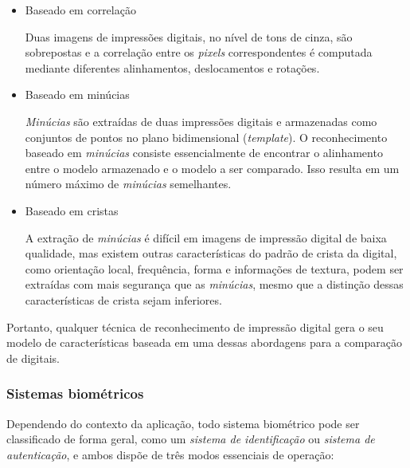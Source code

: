  \begin{itemize}
  \item Baseado em correlação
      
  Duas imagens de impressões digitais, no nível de tons de cinza, são sobrepostas e a correlação entre os \textit{pixels} correspondentes é computada mediante diferentes alinhamentos, deslocamentos e rotações.

  \item Baseado em minúcias
  
  \textit{Minúcias} são extraídas de duas impressões digitais e armazenadas como conjuntos de pontos no plano bidimensional (\textit{template}). O reconhecimento baseado em \textit{minúcias} consiste essencialmente de encontrar o alinhamento entre o modelo armazenado e o modelo a ser comparado. Isso resulta em um número máximo de \textit{minúcias} semelhantes.


  \item Baseado em cristas
 
  A extração de \textit{minúcias} é difícil em imagens de impressão digital de baixa qualidade, mas existem outras características do padrão de crista da digital, como orientação local, frequência, forma e informações de textura, podem ser extraídas com mais segurança que as \textit{minúcias}, mesmo que a distinção dessas características de crista sejam inferiores.

  \end{itemize}
  
  
  Portanto, qualquer técnica de reconhecimento de impressão digital gera o seu modelo de características baseada em uma dessas abordagens para a comparação de digitais.
  


\subsubsection{Sistemas biométricos}

  Dependendo do contexto da aplicação, todo sistema biométrico pode ser classificado de forma geral, como um \textit{sistema de identificação} ou \textit{sistema de  autenticação}, e ambos dispõe de três modos essenciais de operação: 

